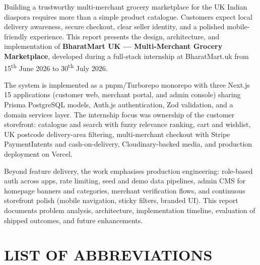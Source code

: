 \documentclass[12pt,a4paper]{report}
\begin{document}
\noindent Building a trustworthy multi-merchant grocery marketplace for the UK Indian diaspora requires more than a simple product catalogue. Customers expect local delivery awareness, secure checkout, clear seller identity, and a polished mobile-friendly experience. This report presents the design, architecture, and implementation of \textbf{BharatMart UK --- Multi-Merchant Grocery Marketplace}, developed during a full-stack internship at BharatMart.uk from 15\textsuperscript{th} June 2026 to 30\textsuperscript{th} July 2026.

\vspace{0.4cm}

\noindent The system is implemented as a pnpm/Turborepo monorepo with three Next.js 15 applications (customer web, merchant portal, and admin console) sharing Prisma PostgreSQL models, Auth.js authentication, Zod validation, and a domain services layer. The internship focus was ownership of the customer storefront: catalogue and search with fuzzy relevance ranking, cart and wishlist, UK postcode delivery-area filtering, multi-merchant checkout with Stripe PaymentIntents and cash-on-delivery, Cloudinary-backed media, and production deployment on Vercel.

\vspace{0.4cm}

\noindent Beyond feature delivery, the work emphasises production engineering: role-based auth across apps, rate limiting, seed and demo data pipelines, admin CMS for homepage banners and categories, merchant verification flows, and continuous storefront polish (mobile navigation, sticky filters, branded UI). This report documents problem analysis, architecture, implementation timeline, evaluation of shipped outcomes, and future enhancements.


\newpage
\tableofcontents

\newpage
\listoffigures
{}

\newpage
\listoftables
{}

\newpage
\chapter*{LIST OF ABBREVIATIONS}
\end{document}
